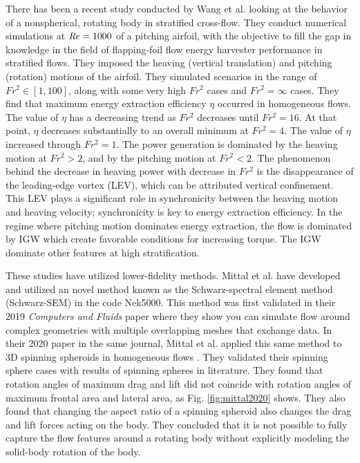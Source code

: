 There has been a recent study conducted by Wang et al. \cite{wang_numerical_2023} looking at the behavior of a nonspherical, rotating body in stratified cross-flow. They conduct numerical simulations at $\mathit{Re} = 1000$ of a pitching airfoil, with the objective to fill the gap in knowledge in the field of flapping-foil flow energy harvester performance in stratified flows. They imposed the heaving (vertical translation) and pitching (rotation) motions of the airfoil. They simulated scenarios in the range of $Fr^2 \in [1, 100]$, along with some very high $Fr^2$ cases and $Fr^2 = \infty$ cases. They find that maximum energy extraction efficiency $\eta$ occurred in homogeneous flows. The value of $\eta$ has a decreasing trend as $Fr^2$ decreases until $Fr^2 = 16$. At that point, $\eta$ decreases substantially to an overall minimum at $Fr^2 = 4$. The value of $\eta$ increased through $Fr^2 = 1$. The power generation is dominated by the heaving motion at $Fr^2 > 2$, and by the pitching motion at $Fr^2 < 2$. The phenomenon behind the decrease in heaving power with decrease in $Fr^2$ is the disappearance of the leading-edge vortex (LEV), which can be attributed vertical confinement. This LEV plays a significant role in synchronicity between the heaving motion and heaving velocity; synchronicity is key to energy extraction efficiency. In the regime where pitching motion dominates energy extraction, the flow is dominated by IGW which create favorable conditions for increasing torque. The IGW dominate other features at high stratification. 

These studies have utilized lower-fidelity methods. Mittal et al. have developed and utilized an novel method known as the Schwarz-spectral element method (Schwarz-SEM) in the code Nek5000. This method was first validated in their 2019 \textit{Computers and Fluids} paper \cite{mittal_nonconforming_2019} where they show you can simulate flow around complex geometries with multiple overlapping meshes that exchange data. In their 2020 paper in the same journal, Mittal et al. applied this same method to 3D spinning spheroids in homogeneous flows \cite{mittal_direct_2020}. They validated their spinning sphere cases with results of spinning spheres in literature. They found that rotation angles of maximum drag and lift did not coincide with rotation angles of maximum frontal area and lateral area, as Fig. \ref{fig:mittal2020} shows. They also found that changing the aspect ratio of a spinning spheroid also changes the drag and lift forces acting on the body. They concluded that it is not possible to fully capture the flow features around a rotating body without explicitly modeling the solid-body rotation of the body.  

